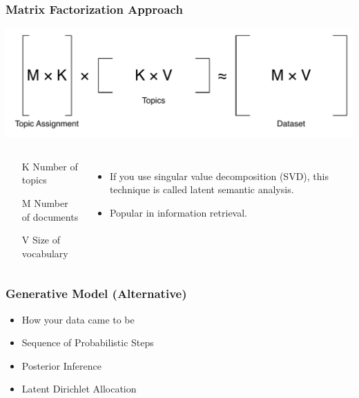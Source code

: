 \iflong

\frame
{
  \frametitle{Matrix Factorization Approach}

\begin{center}
\includegraphics[width=0.9\linewidth]{topic_models/factorization.pdf}
\end{center}

\begin{columns}
\begin{block}{}
	\begin{itemize}
		\item[K] Number of topics
		\item[M] Number of documents
		\item[V] Size of vocabulary
	\end{itemize}
\end{block}
\pause
\begin{itemize}
\item If you use singular value decomposition (SVD), this technique is called latent semantic analysis.
\item Popular in information retrieval.
\end{itemize}
\end{columns}

}

\fi

\begin{frame}

\frametitle{Generative Model \iflong (Alternative) \fi}

\begin{itemize}
  \item How your data came to be
  \item Sequence of Probabilistic Steps
  \item Posterior Inference
    \pause
   \item Latent Dirichlet Allocation~\cite{blei-03}
\end{itemize}

\end{frame}

\iflong

